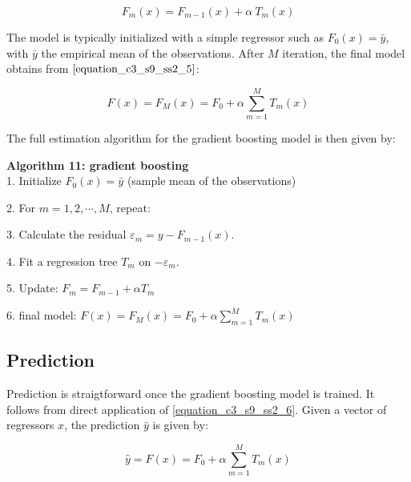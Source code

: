 \begin{equation}
F_{m} (x) = F_{m-1} (x) + \alpha \ T_m(x)
\label{equation_c3_s9_ss2_5}
\end{equation}

\newpage

The model is typically initialized with a simple regressor such as $F_0(x) = \bar{y}$, with $\bar{y}$ the empirical mean of the observations. After $M$ iteration, the final model obtains from $\ref{equation_c3_s9_ss2_5}$:

\begin{equation}
F(x) = F_{M} (x) = F_0 + \alpha \sum_{m=1}^{M} T_m (x)
\label{equation_c3_s9_ss2_6}
\end{equation}

The full estimation algorithm for the gradient boosting model is then given by:

\textbf{Algorithm 11: gradient boosting} \vspace{3mm} \\
1. Initialize $F_0(x) = \bar{y}$ (sample mean of the observations)

2. For $m = 1, 2, \cdots, M$, repeat:

3. Calculate the residual $\varepsilon_m = y - F_{m-1}(x)$.

4. Fit a regression tree $T_m$ on $-\varepsilon_m$.

5. Update: $F_{m} = F_{m-1} + \alpha T_m$

6. final model: $F(x) = F_{M} (x) = F_0 + \alpha \sum_{m=1}^{M} T_m (x)$



\subsection{Prediction}
\label{chapter3_section9_subsection3}


Prediction is straigtforward once the gradient boosting model is trained. It follows from direct application of \ref{equation_c3_s9_ss2_6}. Given a vector of regressors $x$, the prediction $\hat{y}$ is given by:

\begin{equation}
\hat{y} = F(x) = F_0 + \alpha \sum_{m=1}^{M} T_m (x)
\label{equation_c3_s9_ss3_1} 
\end{equation}
